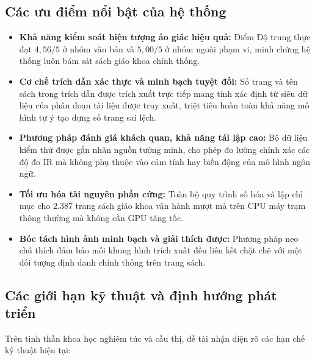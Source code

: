 \subsection{Các ưu điểm nổi bật của hệ thống}
\begin{itemize}
    \item \textbf{Khả năng kiểm soát hiện tượng ảo giác hiệu quả:} Điểm Độ trung thực đạt $4{,}56/5$ ở nhóm văn bản và $5{,}00/5$ ở nhóm ngoài phạm vi, minh chứng hệ thống luôn bám sát sách giáo khoa chính thống.
    \item \textbf{Cơ chế trích dẫn xác thực và minh bạch tuyệt đối:} Số trang và tên sách trong trích dẫn được trích xuất trực tiếp mang tính xác định từ siêu dữ liệu của phân đoạn tài liệu được truy xuất, triệt tiêu hoàn toàn khả năng mô hình tự ý tạo dựng số trang sai lệch.
    \item \textbf{Phương pháp đánh giá khách quan, khả năng tái lập cao:} Bộ dữ liệu kiểm thử được gắn nhãn nguồn tường minh, cho phép đo lường chính xác các độ đo IR mà không phụ thuộc vào cảm tính hay biến động của mô hình ngôn ngữ.
    \item \textbf{Tối ưu hóa tài nguyên phần cứng:} Toàn bộ quy trình số hóa và lập chỉ mục cho $2.387$ trang sách giáo khoa vận hành mượt mà trên CPU máy trạm thông thường mà không cần GPU tăng tốc.
    \item \textbf{Bóc tách hình ảnh minh bạch và giải thích được:} Phương pháp neo chú thích đảm bảo mỗi khung hình trích xuất đều liên kết chặt chẽ với một đối tượng định danh chính thống trên trang sách.
\end{itemize}

\subsection{Các giới hạn kỹ thuật và định hướng phát triển}
\label{sec:hanche}
Trên tinh thần khoa học nghiêm túc và cầu thị, đề tài nhận diện rõ các hạn chế kỹ thuật hiện tại:


